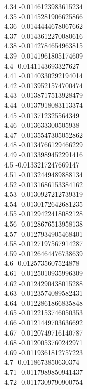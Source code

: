 {4.34	-0.0146123983615234\\
4.35	-0.0145281906625866\\
4.36	-0.0144444678067662\\
4.37	-0.0143612270080616\\
4.38	-0.0142784654963815\\
4.39	-0.0141961805174609\\
4.4	-0.0141143693327627\\
4.41	-0.0140330292194014\\
4.42	-0.0139521574700474\\
4.43	-0.0138717513928479\\
4.44	-0.0137918083113374\\
4.45	-0.013712325564349\\
4.46	-0.013633300505938\\
4.47	-0.0135547305052862\\
4.48	-0.0134766129466229\\
4.49	-0.0133989452291416\\
4.5	-0.0133217247669147\\
4.51	-0.0132449489888134\\
4.52	-0.0131686153384162\\
4.53	-0.0130927212739319\\
4.54	-0.0130172642681235\\
4.55	-0.0129422418082128\\
4.56	-0.0128676513958138\\
4.57	-0.0127934905468401\\
4.58	-0.0127197567914287\\
4.59	-0.0126464476738639\\
4.6	-0.0125735607524878\\
4.61	-0.0125010935996309\\
4.62	-0.0124290438015288\\
4.63	-0.0123574089582431\\
4.64	-0.0122861866835848\\
4.65	-0.0122153746050353\\
4.66	-0.0121449703636692\\
4.67	-0.0120749716140787\\
4.68	-0.0120053760242971\\
4.69	-0.0119361812757223\\
4.7	-0.0118673850630374\\
4.71	-0.0117989850941437\\
4.72	-0.0117309790900754\\
}
